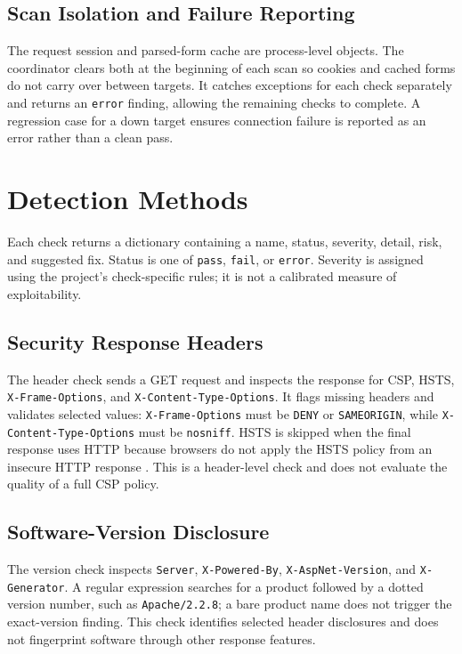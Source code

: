 \documentclass[conference]{IEEEtran}
\begin{document}
\subsection{Scan Isolation and Failure Reporting}
The request session and parsed-form cache are process-level objects. The
coordinator clears both at the beginning of each scan so cookies and cached
forms do not carry over between targets. It catches exceptions for each check
separately and returns an \texttt{error} finding, allowing the remaining checks
to complete. A regression case for a down target ensures connection failure
is reported as an error rather than a clean pass.

\section{Detection Methods}
Each check returns a dictionary containing a name, status, severity, detail,
risk, and suggested fix. Status is one of \texttt{pass}, \texttt{fail}, or
\texttt{error}. Severity is assigned using the project's check-specific rules;
it is not a calibrated measure of exploitability.

\subsection{Security Response Headers}
The header check sends a GET request and inspects the response for CSP, HSTS,
\texttt{X-Frame-Options}, and \texttt{X-Content-Type-Options}. It flags missing
headers and validates selected values: \texttt{X-Frame-Options} must be
\texttt{DENY} or \texttt{SAMEORIGIN}, while
\texttt{X-Content-Type-Options} must be \texttt{nosniff}. HSTS is skipped when
the final response uses HTTP because browsers do not apply the HSTS policy from
an insecure HTTP response \cite{rfc6797}. This is a header-level check and does
not evaluate the quality of a full CSP policy.

\subsection{Software-Version Disclosure}
The version check inspects \texttt{Server}, \texttt{X-Powered-By},
\texttt{X-AspNet-Version}, and \texttt{X-Generator}. A regular expression
searches for a product followed by a dotted version number, such as
\texttt{Apache/2.2.8}; a bare product name does not trigger the exact-version
finding. This check identifies selected header disclosures and does not
fingerprint software through other response features.
\end{document}
